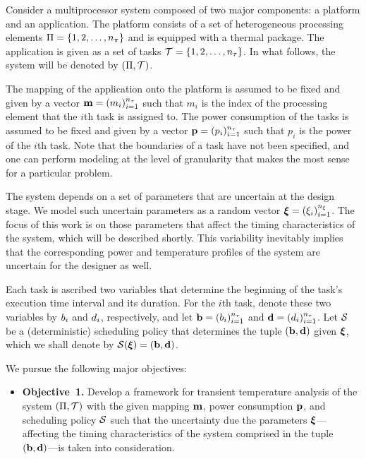 Consider a multiprocessor system composed of two major components: a platform
and an application. The platform consists of a set of heterogeneous processing
elements $\Pi = \{ 1, 2, \dots, {n_\pi} \}$ and is equipped with a thermal
package. The application is given as a set of tasks $\mathcal{T} = \{ 1, 2, \dots,
{n_\tau} \}$. In what follows, the system will be denoted by $(\Pi, \mathcal{T})$.

The mapping of the application onto the platform is assumed to be fixed and
given by a vector $\mathbf{m} = (m_i)_{i = 1}^{{n_\tau}}$ such that $m_i$ is the index
of the processing element that the $i$th task is assigned to. The power
consumption of the tasks is assumed to be fixed and given by a vector $\mathbf{p} =
(p_i)_{i = 1}^{{n_\tau}}$ such that $p_i$ is the power of the $i$th task. Note that
the boundaries of a task have not been specified, and one can perform modeling
at the level of granularity that makes the most sense for a particular problem.

The system depends on a set of parameters that are uncertain at the design
stage. We model such uncertain parameters as a random vector $\bm{\xi} = (\xi_i)_{i =
1}^{n_\xi}$. The focus of this work is on those parameters that affect the timing
characteristics of the system, which will be described shortly. This variability
inevitably implies that the corresponding power and temperature profiles of the
system are uncertain for the designer as well.

Each task is ascribed two variables that determine the beginning of the task's
execution time interval and its duration. For the $i$th task, denote these two
variables by $b_i$ and $d_i$, respectively, and let $\mathbf{b} = (b_i)_{i=1}^{{n_\tau}}$
and $\mathbf{d} = (d_i)_{i=1}^{{n_\tau}}$. Let $\mathcal{S}$ be a (deterministic) scheduling
policy that determines the tuple $(\mathbf{b}, \mathbf{d})$ given $\bm{\xi}$, which we shall denote
by $\mathcal{S}(\bm{\xi}) = (\mathbf{b}, \mathbf{d})$.

We pursue the following major objectives:
\begin{itemize}

  \item {\bfseries Objective~1.} Develop a framework for transient temperature
    analysis of the system $(\Pi, \mathcal{T})$ with the given mapping $\mathbf{m}$,
    power consumption $\mathbf{p}$, and scheduling policy $\mathcal{S}$ such that the
    uncertainty due the parameters $\bm{\xi}$---affecting the timing characteristics
    of the system comprised in the tuple $(\mathbf{b}, \mathbf{d})$---is taken into
    consideration.

\end{itemize}
